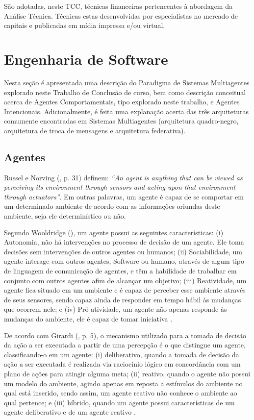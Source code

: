 São adotadas, neste TCC, técnicas financeiras pertencentes à abordagem da Análise Técnica. Técnicas estas desenvolvidas por especialistas no mercado de capitais e publicadas em mídia impressa e/ou virtual.


\section{Engenharia de Software}

Nesta seção é apresentada uma descrição do Paradigma de Sistemas Multiagentes explorado neste Trabalho de Conclusão de curso, bem como descrição conceitual acerca de Agentes Comportamentais, tipo explorado neste trabalho, e Agentes Intencionais. Adicionalmente, é feita uma explanação acerta das três arquiteturas comumente encontradas em Sistemas Multiagentes (arquitetura quadro-negro, arquitetura de troca de mensagens e arquitetura federativa).

\subsection{Agentes}

Russel e Norving (\citeyear{russel2003}, p. 31) definem: \textit{“An agent is anything that can be viewed as perceiving its environment through sensors and acting upon that environment through actuators”}. Em outras palavras, um agente é capaz de se comportar em um determinado ambiente de acordo com as informações oriundas deste ambiente, seja ele determinístico ou não.

Segundo Wooldridge (\citeyear{wooldrige2002}), um agente possui as seguintes características: (i) Autonomia, não há intervenções no processo de decisão de um agente. Ele toma decisões sem intervenções de outros agentes ou humanos; (ii) Sociabilidade, um agente interage com outros agentes, Software ou humano, através de algum tipo de linguagem de comunicação de agentes, e têm a habilidade de trabalhar em conjunto com outros agentes afim de alcançar um objetivo; (iii) Reatividade, um agente fica situado em um ambiente e é capaz de perceber esse ambiente através de seus sensores, sendo capaz ainda de responder em tempo hábil às mudanças que ocorrem nele; e (iv) Pró-atividade, um agente não apenas responde às mudanças do ambiente, ele é capaz de tomar iniciativa \cite[p. 2-3]{wooldrige2002}.

De acordo com Girardi (\citeyear{girardi2004}, p. 5), o mecanismo utilizado para a tomada de decisão da ação a ser executada a partir de uma percepção é o que distingue um agente, classificando-o em um agente: (i) deliberativo, quando a tomada de decisão da ação a ser executada é realizada via raciocínio lógico em concordância com um plano de ações para atingir alguma meta; (ii) reativo, quando o agente não possui um modelo do ambiente, agindo apenas em reposta a estímulos do ambiente no qual está inserido, sendo assim, um agente reativo não conhece o ambiente ao qual pertence; e (iii) híbrido, quando um agente possui características de um agente deliberativo e de um agente reativo \cite[p. 5]{girardi2004}. 

